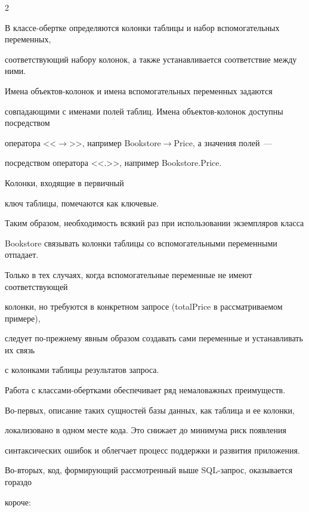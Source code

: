 \begin{multicols}{2}



В классе-обертке определяются колонки таблицы и набор вспомогательных переменных, 

соответствующий набору колонок, а также устанавливается соответствие между ними. 



Имена объек\-тов-ко\-ло\-нок и имена вспомогательных переменных задаются 

совпадающими с именами полей таблиц. Имена объектов-колонок доступны посредством 

оператора <<$\rightarrow$>>, например Bookstore$\rightarrow$Price, а значения полей~--- 

посредством оператора <<.>>, например \mbox{Bookstore.Price}. 



Колонки, входящие в первичный 

ключ таблицы, помечаются как ключевые.



Таким образом, необходимость всякий раз при использовании экземпляров класса 

Bookstore связывать колонки таблицы со вспомогательными переменными отпадает. 



Только в тех случаях, когда вспомогательные переменные не имеют соответствующей 

колонки, но требуются в конкретном запросе (totalPrice в рассматриваемом примере), 

следует по-прежнему явным образом создавать сами переменные и устанавливать их связь 

с колонками таблицы результатов запроса.



Работа с классами-обертками обеспечивает ряд немаловажных преимуществ.



Во-первых, описание таких сущностей базы данных, как таблица и ее колонки, 

локализовано в одном месте кода. Это снижает до минимума риск появления 

синтаксических ошибок и облегчает процесс поддержки и развития приложения.



Во-вторых, код, формирующий рассмотренный выше SQL-за\-прос, оказывается гораздо 

короче: 


\end{multicols}
